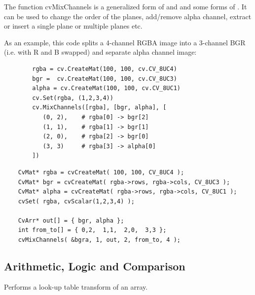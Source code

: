 The function cvMixChannels is a generalized form of  and 
and some forms of . It can be used to change the order of the
planes, add/remove alpha channel, extract or insert a single plane or
multiple planes etc.

As an example, this code splits a 4-channel RGBA image into a 3-channel
BGR (i.e. with R and B swapped) and separate alpha channel image:

\ifPython
\begin{lstlisting}
        rgba = cv.CreateMat(100, 100, cv.CV_8UC4)
        bgr =  cv.CreateMat(100, 100, cv.CV_8UC3)
        alpha = cv.CreateMat(100, 100, cv.CV_8UC1)
        cv.Set(rgba, (1,2,3,4))
        cv.MixChannels([rgba], [bgr, alpha], [
           (0, 2),    # rgba[0] -> bgr[2]
           (1, 1),    # rgba[1] -> bgr[1]
           (2, 0),    # rgba[2] -> bgr[0]
           (3, 3)     # rgba[3] -> alpha[0]
        ])
\end{lstlisting}
\fi

\ifC
\begin{lstlisting}
    CvMat* rgba = cvCreateMat( 100, 100, CV_8UC4 );
    CvMat* bgr = cvCreateMat( rgba->rows, rgba->cols, CV_8UC3 );
    CvMat* alpha = cvCreateMat( rgba->rows, rgba->cols, CV_8UC1 );
    cvSet( rgba, cvScalar(1,2,3,4) );

    CvArr* out[] = { bgr, alpha };
    int from_to[] = { 0,2,  1,1,  2,0,  3,3 };
    cvMixChannels( &bgra, 1, out, 2, from_to, 4 );
\end{lstlisting}
\fi

\subsection{Arithmetic, Logic and Comparison}

\label{LUT}

Performs a look-up table transform of an array.


\begin{description}
\end{description}

